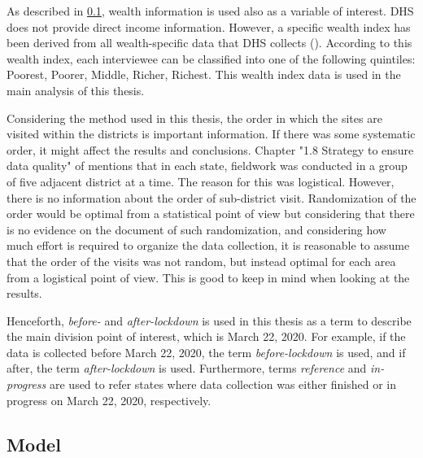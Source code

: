 \documentclass[12pt,a4paper,notitlepage]{article}
\begin{document}
\begin{figure}
\end{figure}

As described in \cref{subsec:model}, wealth information is used also as a variable of interest. DHS does not provide direct income information. However, a specific wealth index has been derived from all wealth-specific data that DHS collects (\citet{DhsWealth:2004}). According to this wealth index, each interviewee can be classified into one of the following quintiles: Poorest, Poorer, Middle, Richer, Richest. This wealth index data is used in the main analysis of this thesis.

Considering the method used in this thesis, the order in which the sites are visited within the districts is important information. If there was some systematic order, it might affect the results and conclusions. Chapter "1.8 Strategy to ensure data quality" of \citet{iips2021} mentions that in each state, fieldwork was conducted in a group of five adjacent district at a time. The reason for this was logistical. However, there is no information about the order of sub-district visit. Randomization of the order would be optimal from a statistical point of view but considering that there is no evidence on the document of such randomization, and considering how much effort is required to organize the data collection, it is reasonable to assume that the order of the visits was not random, but instead optimal for each area from a logistical point of view. This is good to keep in mind when looking at the results.

Henceforth, \textit{before-} and \textit{after-lockdown} is used in this thesis as a term to describe the main division point of interest, which is March 22, 2020. For example, if the data is collected before March 22, 2020, the term \textit{before-lockdown} is used, and if after, the term \textit{after-lockdown} is used. Furthermore, terms \textit{reference} and \textit{in-progress} are used to refer states where data collection was either finished or in progress on March 22, 2020, respectively.

\subsection{Model} \label{subsec:model}
\end{document}
